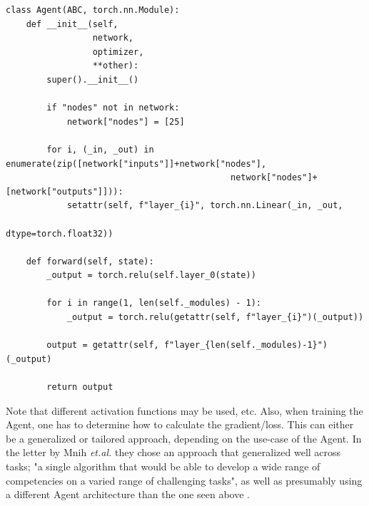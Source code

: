 \documentclass{article}
\begin{document}
\begin{lstlisting}
class Agent(ABC, torch.nn.Module):
    def __init__(self,
                 network,
                 optimizer,
                 **other):
        super().__init__()

        if "nodes" not in network:
            network["nodes"] = [25]

        for i, (_in, _out) in enumerate(zip([network["inputs"]]+network["nodes"],
                                            network["nodes"]+[network["outputs"]])):
            setattr(self, f"layer_{i}", torch.nn.Linear(_in, _out,
                                                        dtype=torch.float32))

    def forward(self, state):
        _output = torch.relu(self.layer_0(state))

        for i in range(1, len(self._modules) - 1):
            _output = torch.relu(getattr(self, f"layer_{i}")(_output))

        output = getattr(self, f"layer_{len(self._modules)-1}")(_output)

        return output
\end{lstlisting}

Note that different activation functions may be used, etc. Also, when training the Agent, one has to determine how to calculate the gradient/loss. This can either be a generalized or tailored approach, depending on the use-case of the Agent. In the letter by Mnih \textit{et.al.} they chose an approach that generalized well across tasks; "a single algorithm that would be able to develop a wide range of competencies on a varied range of challenging tasks", as well as presumably using a different Agent architecture than the one seen above \cite{Human-level}.
\end{document}
